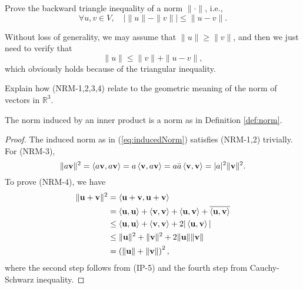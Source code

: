 \begin{exc}
  Prove the backward triangle inequality of a norm $\|\cdot\|$, i.e., 
  \begin{equation}
    \label{eq:backwardTriangle}
    \forall u,v \in V,\quad
    \left|\|u\|-\|v\|\right| \le \|u-v\|.
  \end{equation}
\end{exc}
\begin{solution}
  Without loss of generality, we may assume that $\|u\|\geq\|v\|$, and then we just need to verify that
  \begin{equation*}
    \|u\|\leq\|v\|+\|u-v\|,
  \end{equation*}
  which obviously holds because of the triangular inequality.
\end{solution}

\begin{exc}
  Explain how (NRM-1,2,3,4) relate to the geometric meaning
  of the norm of vectors in $\mathbb{R}^3$.
\end{exc}

\begin{lem}
  \label{lem:inducedNormIsNorm}
  The norm induced by an inner product
  is a norm as in Definition \ref{def:norm}.
\end{lem}
\begin{proof}
  The induced norm as in (\ref{eq:inducedNorm})
  satisfies (NRM-1,2) trivially. For (NRM-3),
  \begin{equation*}
    \|a\mathbf{v}\|^2 = \left\langle a\mathbf{v}, a\mathbf{v} \right\rangle
    = a\left\langle \mathbf{v}, a\mathbf{v} \right\rangle
    = a\bar{a}\left\langle \mathbf{v},\mathbf{v} \right\rangle
    = |a|^2 \|\mathbf{v}\|^2.
  \end{equation*}
  To prove (NRM-4), we have
  \begin{align*}
    \|\mathbf{u}+\mathbf{v}\|^2 &=
                                  \left\langle \mathbf{u}+\mathbf{v}, \mathbf{u}+\mathbf{v} \right\rangle
    \\ &=
         \left\langle \mathbf{u}, \mathbf{u} \right\rangle+ \left\langle \mathbf{v},\mathbf{v} \right\rangle
         + \left\langle \mathbf{u}, \mathbf{v} \right\rangle+ \overline{\left\langle \mathbf{u},\mathbf{v} \right\rangle}
    \\ &\le
         \left\langle \mathbf{u}, \mathbf{u} \right\rangle+ \left\langle \mathbf{v},\mathbf{v} \right\rangle
         + 2|\left\langle \mathbf{u}, \mathbf{v} \right\rangle|
    \\ &\le
         \|\mathbf{u}\|^2+\|\mathbf{v}\|^2+2\|\mathbf{u}\|\|\mathbf{v}\|
    \\ &=
         \left(\|\mathbf{u}\|+\|\mathbf{v}\|\right)^2,
  \end{align*}
  where the second step follows from (IP-5)
  and the fourth step from
  Cauchy-Schwarz inequality.
\end{proof}

